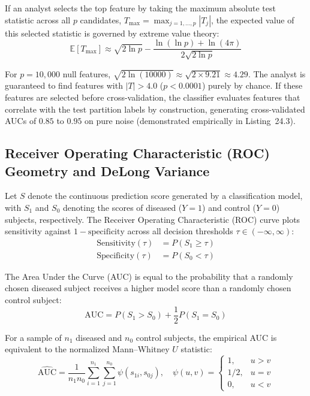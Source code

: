 \documentclass[11pt,twoside,openright]{book}
\begin{document}
If an analyst selects the top feature by taking the maximum absolute test statistic across all $p$ candidates, $T_{\max} = \max_{j=1,\dots,p} |T_j|$, the expected value of this selected statistic is governed by extreme value theory:
\begin{equation}
\mathbb{E}[T_{\max}] \approx \sqrt{2 \ln p} - \frac{\ln(\ln p) + \ln(4\pi)}{2 \sqrt{2 \ln p}}
\label{eq:extreme_value}
\end{equation}

For $p = 10,000$ null features, $\sqrt{2 \ln(10000)} \approx \sqrt{2 \times 9.21} \approx 4.29$. The analyst is guaranteed to find features with $|T| > 4.0$ ($p < 0.0001$) purely by chance. If these features are selected before cross-validation, the classifier evaluates features that correlate with the test partition labels by construction, generating cross-validated AUCs of $0.85$ to $0.95$ on pure noise (demonstrated empirically in Listing~24.3).

\subsection{Receiver Operating Characteristic (ROC) Geometry and DeLong Variance}

Let $S$ denote the continuous prediction score generated by a classification model, with $S_1$ and $S_0$ denoting the scores of diseased ($Y = 1$) and control ($Y = 0$) subjects, respectively. The Receiver Operating Characteristic (ROC) curve plots sensitivity against $1 - \text{specificity}$ across all decision thresholds $\tau \in (-\infty, \infty)$:
\begin{align}
\text{Sensitivity}(\tau) &= P(S_1 \ge \tau) \\
\text{Specificity}(\tau) &= P(S_0 < \tau)
\end{align}

The Area Under the Curve (AUC) is equal to the probability that a randomly chosen diseased subject receives a higher model score than a randomly chosen control subject:
\begin{equation}
\text{AUC} = P(S_1 > S_0) + \frac{1}{2} P(S_1 = S_0)
\label{eq:auc_prob}
\end{equation}

For a sample of $n_1$ diseased and $n_0$ control subjects, the empirical AUC is equivalent to the normalized Mann--Whitney $U$ statistic:
\begin{equation}
\widehat{\text{AUC}} = \frac{1}{n_1 n_0} \sum_{i=1}^{n_1} \sum_{j=1}^{n_0} \psi(s_{1i}, s_{0j}), \quad \psi(u, v) = 
\begin{cases}
1, & u > v \\
1/2, & u = v \\
0, & u < v
\end{cases}
\label{eq:mann_whitney}
\end{equation}
\end{document}
